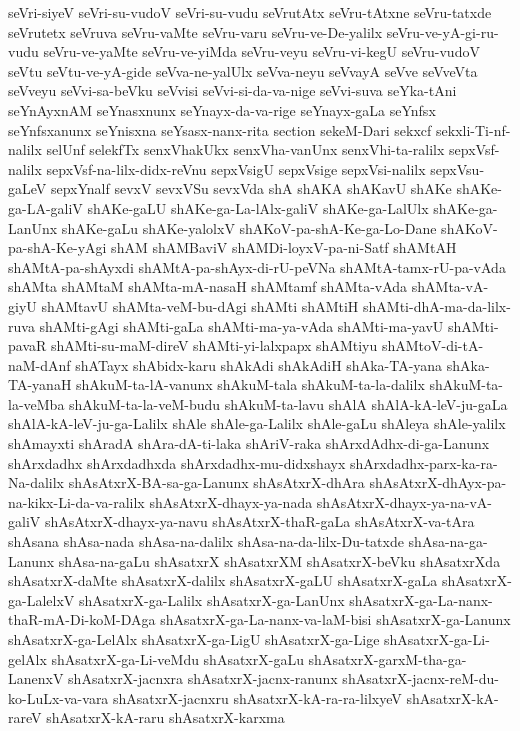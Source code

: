 {seVri-siyeV
seVri-su-vudoV
seVri-su-vudu
seVrutAtx
seVru-tAtxne
seVru-tatxde
seVrutetx
seVruva
seVru-vaMte
seVru-varu
seVru-ve-De-yalilx
seVru-ve-yA-gi-ru-vudu
seVru-ve-yaMte
seVru-ve-yiMda
seVru-veyu
seVru-vi-kegU
seVru-vudoV
seVtu
seVtu-ve-yA-gide
seVva-ne-yalUlx
seVva-neyu
seVvayA
seVve
seVveVta
seVveyu
seVvi-sa-beVku
seVvisi
seVvi-si-da-va-nige
seVvi-suva
seYka-tAni
seYnAyxnAM
seYnasxnunx
seYnayx-da-va-rige
seYnayx-gaLa
seYnfsx
seYnfsxanunx
seYnisxna
seYsasx-nanx-rita
section
sekeM-Dari
sekxcf
sekxli-Ti-nf-nalilx
selUnf
selekfTx
senxVhakUkx
senxVha-vanUnx
senxVhi-ta-ralilx
sepxVsf-nalilx
sepxVsf-na-lilx-didx-reVnu
sepxVsigU
sepxVsige
sepxVsi-nalilx
sepxVsu-gaLeV
sepxYnalf
sevxV
sevxVSu
sevxVda
shA
shAKA
shAKavU
shAKe
shAKe-ga-LA-galiV
shAKe-gaLU
shAKe-ga-La-lAlx-galiV
shAKe-ga-LalUlx
shAKe-ga-LanUnx
shAKe-gaLu
shAKe-yalolxV
shAKoV-pa-shA-Ke-ga-Lo-Dane
shAKoV-pa-shA-Ke-yAgi
shAM
shAMBaviV
shAMDi-loyxV-pa-ni-Satf
shAMtAH
shAMtA-pa-shAyxdi
shAMtA-pa-shAyx-di-rU-peVNa
shAMtA-tamx-rU-pa-vAda
shAMta
shAMtaM
shAMta-mA-nasaH
shAMtamf
shAMta-vAda
shAMta-vA-giyU
shAMtavU
shAMta-veM-bu-dAgi
shAMti
shAMtiH
shAMti-dhA-ma-da-lilx-ruva
shAMti-gAgi
shAMti-gaLa
shAMti-ma-ya-vAda
shAMti-ma-yavU
shAMti-pavaR
shAMti-su-maM-direV
shAMti-yi-lalxpapx
shAMtiyu
shAMtoV-di-tA-naM-dAnf
shATayx
shAbidx-karu
shAkAdi
shAkAdiH
shAka-TA-yana
shAka-TA-yanaH
shAkuM-ta-lA-vanunx
shAkuM-tala
shAkuM-ta-la-dalilx
shAkuM-ta-la-veMba
shAkuM-ta-la-veM-budu
shAkuM-ta-lavu
shAlA
shAlA-kA-leV-ju-gaLa
shAlA-kA-leV-ju-ga-Lalilx
shAle
shAle-ga-Lalilx
shAle-gaLu
shAleya
shAle-yalilx
shAmayxti
shAradA
shAra-dA-ti-laka
shAriV-raka
shArxdAdhx-di-ga-Lanunx
shArxdadhx
shArxdadhxda
shArxdadhx-mu-didxshayx
shArxdadhx-parx-ka-ra-Na-dalilx
shAsAtxrX-BA-sa-ga-Lanunx
shAsAtxrX-dhAra
shAsAtxrX-dhAyx-pa-na-kikx-Li-da-va-ralilx
shAsAtxrX-dhayx-ya-nada
shAsAtxrX-dhayx-ya-na-vA-galiV
shAsAtxrX-dhayx-ya-navu
shAsAtxrX-thaR-gaLa
shAsAtxrX-va-tAra
shAsana
shAsa-nada
shAsa-na-dalilx
shAsa-na-da-lilx-Du-tatxde
shAsa-na-ga-Lanunx
shAsa-na-gaLu
shAsatxrX
shAsatxrXM
shAsatxrX-beVku
shAsatxrXda
shAsatxrX-daMte
shAsatxrX-dalilx
shAsatxrX-gaLU
shAsatxrX-gaLa
shAsatxrX-ga-LalelxV
shAsatxrX-ga-Lalilx
shAsatxrX-ga-LanUnx
shAsatxrX-ga-La-nanx-thaR-mA-Di-koM-DAga
shAsatxrX-ga-La-nanx-va-laM-bisi
shAsatxrX-ga-Lanunx
shAsatxrX-ga-LelAlx
shAsatxrX-ga-LigU
shAsatxrX-ga-Lige
shAsatxrX-ga-Li-gelAlx
shAsatxrX-ga-Li-veMdu
shAsatxrX-gaLu
shAsatxrX-garxM-tha-ga-LanenxV
shAsatxrX-jacnxra
shAsatxrX-jacnx-ranunx
shAsatxrX-jacnx-reM-du-ko-LuLx-va-vara
shAsatxrX-jacnxru
shAsatxrX-kA-ra-ra-lilxyeV
shAsatxrX-kA-rareV
shAsatxrX-kA-raru
shAsatxrX-karxma
}
